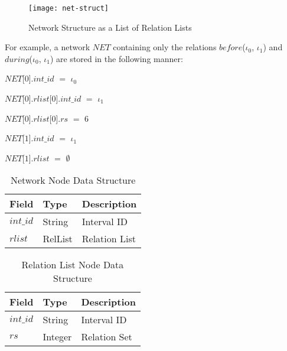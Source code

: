 \documentclass[11pt]{report}
\newenvironment{vquote}
{
  \begin{list}{}{\leftmargin 1em}\item[]
}
{
  \end{list}
}
\begin{document}
          \begin{figure}[[tbhp]
            \begin{center}
              \texttt{[image: net-struct]}
              \caption{Network Structure as a List of Relation Lists}
              \label{fig-net-struct}
            \end{center}
          \end{figure}

          For example, a network $NET$ containing only the relations
          $before$($\iota_0$, $\iota_1$) and $during$($\iota_0$, $\iota_1$) are
          stored in the following manner:

          \begin{vquote}
            $NET$[$0$].$int\_id$ $=$ $\iota_0$

            $NET$[$0$].$rlist$[$0$].$int\_id$ $=$ $\iota_1$

            $NET$[$0$].$rlist$[$0$].$rs$ $=$ $6$

            $NET$[$1$].$int\_id$ $=$ $\iota_1$

            $NET$[$1$].$rlist$ $=$ $\emptyset$
          \end{vquote}

          \begin{table}[tbhp]
            \begin{center}
              \begin{tabular}[t]{|l|l|l|}
                \hline
                {\bf Field} & {\bf Type} & {\bf Description} \\
                \hline
                $int\_id$ & String & Interval ID \\
                \hline
                $rlist$   & RelList & Relation List \\
                \hline
              \end{tabular}
            \end{center}
            \caption[]{Network Node Data Structure}
            \label{table-net-ds}
          \end{table}

          \begin{table}[tbhp]
            \begin{center}
              \begin{tabular}[t]{|l|l|l|}
                \hline
                {\bf Field} & {\bf Type} & {\bf Description} \\
                \hline
                $int\_id$ & String & Interval ID \\
                \hline
                $rs$      & Integer & Relation Set \\
                \hline
              \end{tabular}
            \end{center}
            \caption[]{Relation List Node Data Structure}
            \label{table-rlist-ds}
          \end{table}
\end{document}
